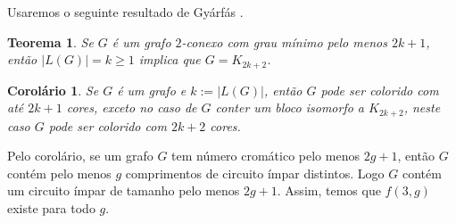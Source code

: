 \documentclass{article}
\newtheorem{teorema}{Teorema}[section]
\newtheorem{corolario}{Corolário}
\begin{document}
Usaremos o seguinte resultado de Gyárfás \cite{gyarfas1992graphs}.

\begin{teorema}\label{gyarfasthm}
Se $G$ é um grafo $2$-conexo com grau mínimo pelo menos $2k+1$, então $|L(G)|=k\geq1$ implica que $G = K_{2k+2}$.
\end{teorema}

\begin{corolario}\label{gyarfascor}
Se $G$ é um grafo e $k := |L(G)|$, então $G$ pode ser colorido com até $2k+1$ cores, exceto no caso de $G$ conter um bloco isomorfo a $K_{2k+2}$, neste caso $G$ pode ser colorido com $2k+2$ cores.
\end{corolario}

Pelo corolário, se um grafo $G$ tem número cromático pelo menos $2g+1$, então $G$ contém pelo menos $g$ comprimentos de circuito ímpar distintos. Logo $G$ contém um circuito ímpar de tamanho pelo menos $2g+1$. Assim, temos que $f(3,g)$ existe para todo $g$.
\end{document}

